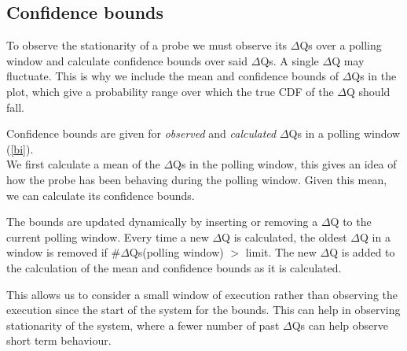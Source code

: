 \subsection{Confidence bounds}
    To observe the stationarity of a probe we must observe its $\Delta$Qs over a polling window and calculate confidence bounds over said $\Delta$Qs. A single $\Delta$Q may fluctuate. This is why we include the mean and confidence bounds of $\Delta$Qs in the plot, which give a probability range over which the true CDF of the $\Delta$Q should fall. \cite{conf-b}

    Confidence bounds are given for \textit{observed} and \textit{calculated} $\Delta$Qs in a polling window (\cref{bi}). \\
    We first calculate a mean of the $\Delta$Qs in the polling window, this gives an idea of how the probe has been behaving during the polling window. Given this mean, we can calculate its confidence bounds.

    The bounds are updated dynamically by inserting or removing a $\Delta$Q to the current polling window. Every time a new $\Delta$Q is calculated, the oldest $\Delta$Q in a window is removed if \#$\Delta$Qs(polling window) $>$ limit. The new $\Delta$Q is added to the calculation of the mean and confidence bounds as it is calculated. 

    This allows us to consider a small window of execution rather than observing the execution since the start of the system for the bounds. This can help in observing stationarity of the system, where a fewer number of past $\Delta$Qs can help observe short term behaviour.


